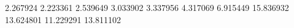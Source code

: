 2.267924
2.223361
2.539649
3.033902
3.337956
4.317069
6.915449
15.836932
13.624801
11.229291
13.811102
